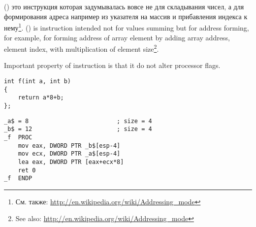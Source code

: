 ﻿%

\section{}
\label{sec:LEA}

\newcommand{\URLAM}{\url{http://en.wikipedia.org/wiki/Addressing_mode}}

\IFRU
{\LEA () это инструкция которая задумывалась вовсе не для складывания чисел, 
а для формирования адреса например из указателя на массив и прибавления индекса к нему\footnote{См. также: \URLAM}.}
{\LEA () is instruction intended not for values summing but for address forming, 
for example, for forming address of array element by adding array address, element index, with 
multiplication of element size\footnote{See also: \URLAM}.}

{Important property of \LEA instruction is that it do not alter processor flags.}


\begin{lstlisting}
int f(int a, int b)
{
	return a*8+b;
};
\end{lstlisting}


\begin{lstlisting}
_a$ = 8							; size = 4
_b$ = 12						; size = 4
_f	PROC
	mov	eax, DWORD PTR _b$[esp-4]
	mov	ecx, DWORD PTR _a$[esp-4]
	lea	eax, DWORD PTR [eax+ecx*8]
	ret	0
_f	ENDP
\end{lstlisting}
